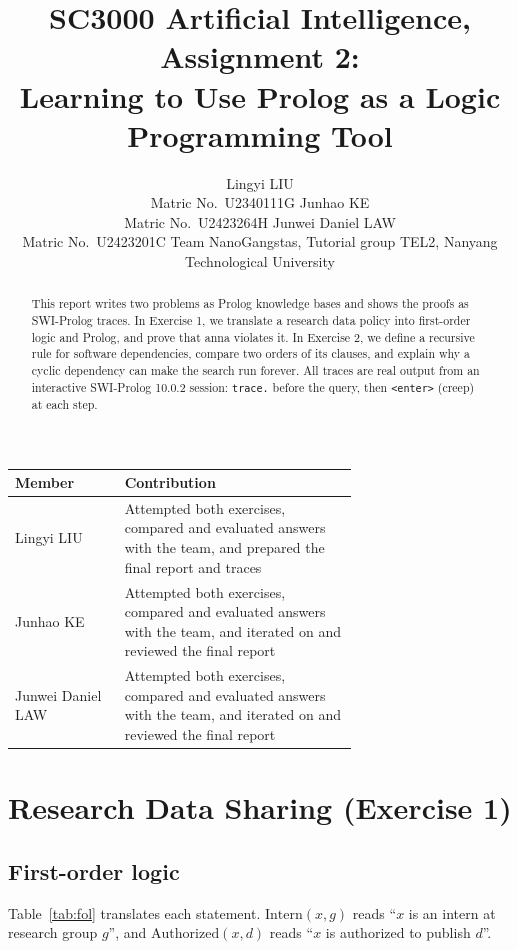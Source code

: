 \documentclass{article}
\title{SC3000 Artificial Intelligence, Assignment 2:\\ Learning to Use Prolog as a Logic Programming Tool}
\author{%
  Lingyi LIU \\ Matric No.\ U2340111G \And
  Junhao KE \\ Matric No.\ U2423264H \And
  Junwei Daniel LAW \\ Matric No.\ U2423201C \AND
  \normalfont Team NanoGangstas, Tutorial group TEL2, Nanyang Technological University
}
\newcommand{\p}[1]{\mathrm{#1}}   %
\begin{document}
\maketitle

\begin{abstract}
This report writes two problems as Prolog knowledge bases and shows the proofs as SWI-Prolog traces.
In Exercise 1, we translate a research data policy into first-order logic and Prolog, and prove that anna violates it.
In Exercise 2, we define a recursive rule for software dependencies, compare two orders of its clauses,
and explain why a cyclic dependency can make the search run forever.
All traces are real output from an interactive SWI-Prolog 10.0.2 session: \texttt{trace.} before the query, then \texttt{<enter>} (creep) at each step.
\end{abstract}

\begin{center}
  \begin{tabular}{lp{0.68\linewidth}}
    \toprule
    Member & Contribution \\
    \midrule
    Lingyi LIU & Attempted both exercises, compared and evaluated answers with the team, and prepared the final report and traces \\
    Junhao KE & Attempted both exercises, compared and evaluated answers with the team, and iterated on and reviewed the final report \\
    Junwei Daniel LAW & Attempted both exercises, compared and evaluated answers with the team, and iterated on and reviewed the final report \\
    \bottomrule
  \end{tabular}
\end{center}

\newpage

\section{Research Data Sharing (Exercise 1)}

\subsection{First-order logic}

Table~\ref{tab:fol} translates each statement. $\p{Intern}(x, g)$ reads ``$x$ is an intern at research group $g$'',
and $\p{Authorized}(x, d)$ reads ``$x$ is authorized to publish $d$''.
\end{document}
